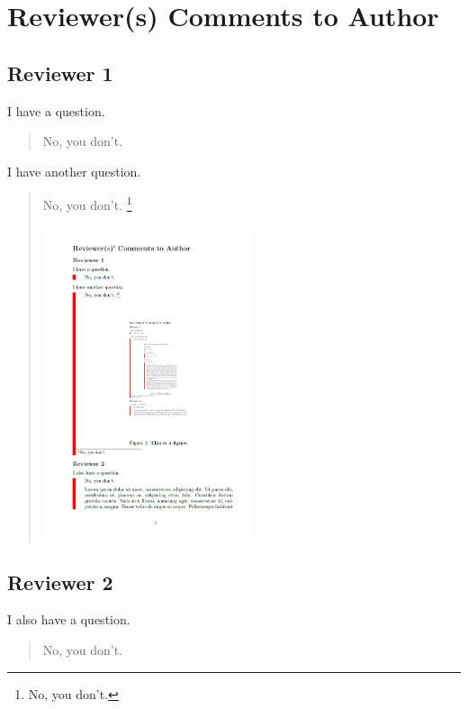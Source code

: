 \documentclass[]{article}
\newenvironment{reply}{\begin{quote}\vspace{0.05cm}\parskip=0.2cm}{\end{quote}}
\begin{document}
\section{Reviewer(s)\textquotesingle{} Comments to Author}

\subsection{Reviewer 1}

I have a question.

\begin{reply}
No, you don't.
\end{reply}

I have another question.

\begin{reply}
No, you don't. \footnote{No, you don't.}

\begin{center}
  \includegraphics[width=0.5\textwidth]{figure.png}
  \label{fig:1}
\end{center}
\end{reply}

\subsection{Reviewer 2}

I also have a question.
\begin{reply}
No, you don't.

\lipsum[1-2]
\end{reply}
\end{document}
